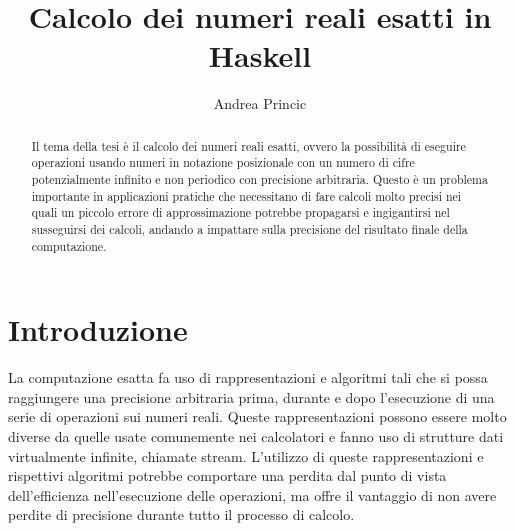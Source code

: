 \documentclass[Lau]{sapthesis}
\title{Calcolo dei numeri reali esatti in Haskell}
\author{Andrea Princic}
\begin{document}
\frontmatter
\maketitle



\begin{abstract}
Il tema della tesi è il calcolo dei numeri reali esatti, ovvero la possibilità 
di eseguire operazioni usando numeri in notazione posizionale con un numero di cifre 
potenzialmente infinito e non periodico con precisione arbitraria. Questo è un 
problema importante in applicazioni pratiche che necessitano di fare calcoli 
molto precisi nei quali un piccolo errore di approssimazione potrebbe propagarsi 
e ingigantirsi nel susseguirsi dei calcoli, andando a impattare sulla precisione 
del risultato finale della computazione.
\end{abstract}



\tableofcontents



\mainmatter



\chapter*{Introduzione}
La computazione esatta fa uso di rappresentazioni e algoritmi tali che si possa raggiungere una precisione arbitraria prima, durante e dopo l'esecuzione di una serie di operazioni sui numeri reali. Queste rappresentazioni possono essere molto diverse da quelle usate comunemente nei calcolatori e fanno uso di strutture dati virtualmente infinite, chiamate stream. L'utilizzo di queste rappresentazioni e rispettivi algoritmi potrebbe comportare una perdita dal punto di vista dell'efficienza nell'esecuzione delle operazioni, ma offre il vantaggio di non avere perdite di precisione durante tutto il processo di calcolo.
\end{document}
